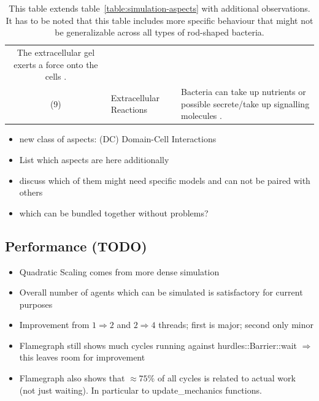 \documentclass{article}
\begin{document}
\begin{table}[H]
\begin{tabularx}{\textwidth}{c l X}
            The extracellular gel exerts a force onto the cells \cite{Grant2014}.\\
        (9) & Extracellular Reactions &
            Bacteria can take up nutrients or possible secrete/take up signalling molecules
            \cite{Li2025}.\\
        \bottomrule
    \end{tabularx}
    \label{table:simulation-aspects-supplement}
    \caption{
        This table extends table~\ref{table:simulation-aspects} with additional observations.
        It has to be noted that this table includes more specific behaviour that might not be
        generalizable across all types of rod-shaped bacteria.
    }
\end{table}

\begin{itemize}
    \item new class of aspects: (DC) Domain-Cell Interactions
    \item List which aspects are here additionally
    \item discuss which of them might need specific models and can not be paired with others
    \item which can be bundled together without problems?
\end{itemize}

\subsection{Performance (TODO)}

\begin{itemize}
    \item Quadratic Scaling comes from more dense simulation
    \item Overall number of agents which can be simulated is satisfactory for current purposes
    \item Improvement from $1 \Rightarrow 2$ and $2\Rightarrow4$ threads; first is major; second
        only minor
    \item Flamegraph still shows much cycles running against hurdles::Barrier::wait $\Rightarrow$
        this leaves room for improvement
    \item Flamegraph also shows that $\approx 75\%$ of all cycles is related to actual work (not
        just waiting).
        In particular to update\_mechanics functions.
\end{itemize}
\end{document}
